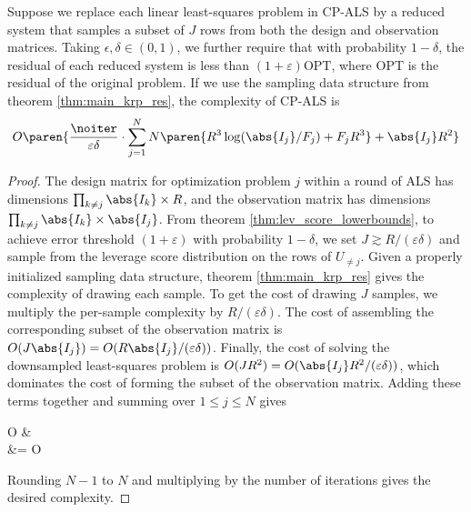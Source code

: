 \begin{corollary}
Suppose we replace each linear least-squares problem in CP-ALS by a reduced system that samples a subset of  
$J$ rows from both the design and observation matrices. Taking $\epsilon, \delta \in (0, 1)$, we further require
that with probability $1 - \delta$, the residual of each reduced system is less than 
$(1 + \varepsilon)\textrm{OPT}$, where $\textrm{OPT}$ is the residual of the original problem. If we use
the sampling data structure from theorem \ref{thm:main_krp_res}, the complexity of CP-ALS is
$$
O \paren{\frac{\noiter}{\varepsilon \delta} 
\cdot \sum_{j=1}^N N \paren{R^3 \log (\abs{I_j} / F_j) + F_j R^3 } + \abs{I_j} R^2 }
$$
\label{cor:downsampled_cpals_complexity}
\end{corollary}

\begin{proof}
The design matrix for optimization problem $j$ within a round of ALS has dimensions
$\prod_{k \neq j} \abs{I_k} \times R$, and the observation matrix has dimensions 
$\prod_{k \neq j} \abs{I_k} \times \abs{I_j}$. From theorem \ref{thm:lev_score_lowerbounds}, 
to achieve error threshold $(1 + \varepsilon)$ with probability $1 - \delta$, we set 
$J \gtrsim R / (\varepsilon \delta)$ and sample from the leverage score distribution on the rows of $U_{\neq j}$.
Given a properly initialized sampling data structure, theorem \ref{thm:main_krp_res} gives the complexity
of drawing each sample. To get the cost of drawing $J$ samples, we multiply the per-sample complexity
by $R / (\varepsilon \delta)$. The cost of assembling the corresponding
subset of the observation matrix is $O(J \abs{I_j}) = O(R \abs{I_j} / (\varepsilon \delta))$. Finally, the
cost of solving the downsampled least-squares problem is $O(J R^2) = O(\abs{I_j} R^2 / (\varepsilon \delta))$, which dominates the cost 
of forming the subset of the observation matrix. Adding these terms together and summing over $1 \leq j \leq N$
gives

\begin{aligned_eq}
O & \\
&= O 
\end{aligned_eq}
Rounding $N-1$ to $N$ and multiplying by the number of iterations gives the desired complexity.
\end{proof}

